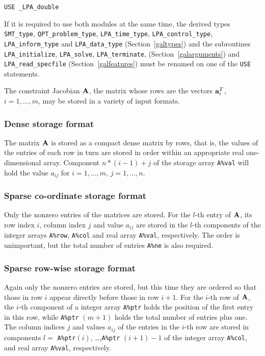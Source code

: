 \documentclass{galahad}
\newcommand{\packagename}{LPA}
\newcommand{\fullpackagename}{\libraryname\_\packagename}
\begin{document}
\medskip{}

\hspace{8mm} {\tt USE  \fullpackagename\_double}

\medskip

\noindent
If it is required to use both modules at the same time, the derived types
{\tt SMT\_type},
{\tt QPT\_problem\_type},
{\tt \packagename\_time\_type},
{\tt \packagename\_control\_type},
{\tt \packagename\_inform\_type}
and
{\tt \packagename\_data\_type}
(Section~\ref{galtypes})
and the subroutines
{\tt \packagename\_initialize},
{\tt \packagename\_\-solve},
{\tt \packagename\_terminate},
(Section~\ref{galarguments})
and
{\tt \packagename\_read\_specfile}
(Section~\ref{galfeatures})
must be renamed on one of the {\tt USE} statements.


\galmatrix
The constraint Jacobian ${\mathbf{A}}$, the matrix
whose rows are the vectors ${\mathbf{a}}_{i}^{T}$, $i = 1, \ldots , m$,
may be stored in a variety of input formats.

\subsubsection{Dense storage format}\label{dense}
The matrix ${\mathbf{A}}$ is stored as a compact
dense matrix by rows, that is, the values of the entries of each row in turn
are stored in order within an appropriate real one-dimensional array.
Component $n \ast (i-1) + j$ of the storage array {\tt A\%val} will hold the
value $a_{ij}$ for $i = 1, \ldots , m$, $j = 1, \ldots , n$.

\subsubsection{Sparse co-ordinate storage format}\label{coordinate}
Only the nonzero entries of the matrices are stored. For the
$l$-th entry of ${\mathbf{A}}$, its row index $i$, column index $j$
and value $a_{ij}$
are stored in the $l$-th components of the integer arrays {\tt A\%row},
{\tt A\%col} and real array {\tt A\%val}, respectively.
The order is unimportant, but the total
number of entries {\tt A\%ne} is also required.

\subsubsection{Sparse row-wise storage format}\label{rowwise}
Again only the nonzero entries are stored, but this time
they are ordered so that those in row $i$ appear directly before those
in row $i+1$. For the $i$-th row of ${\mathbf{A}}$, the $i$-th component of a
integer array {\tt A\%ptr} holds the position of the first entry in this row,
while {\tt A\%ptr} $(m+1)$ holds the total number of entries plus one.
The column indices $j$ and values $a_{ij}$ of the entries in the $i$-th row
are stored in components
$l =$ {\tt A\%ptr}$(i)$, \ldots ,{\tt A\%ptr} $(i+1)-1$ of the
integer array {\tt A\%col}, and real array {\tt A\%val}, respectively.
\end{document}
